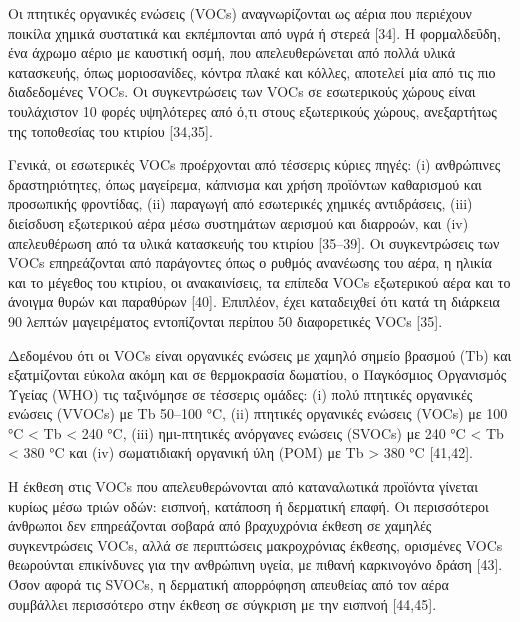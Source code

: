 Οι πτητικές οργανικές ενώσεις (VOCs) αναγνωρίζονται ως αέρια που περιέχουν ποικίλα χημικά συστατικά και εκπέμπονται από υγρά ή στερεά [34]. Η φορμαλδεΰδη, ένα άχρωμο αέριο με καυστική οσμή, που απελευθερώνεται από πολλά υλικά κατασκευής, όπως μοριοσανίδες, κόντρα πλακέ και κόλλες, αποτελεί μία από τις πιο διαδεδομένες VOCs. Οι συγκεντρώσεις των VOCs σε εσωτερικούς χώρους είναι τουλάχιστον 10 φορές υψηλότερες από ό,τι στους εξωτερικούς χώρους, ανεξαρτήτως της τοποθεσίας του κτιρίου [34,35].

Γενικά, οι εσωτερικές VOCs προέρχονται από τέσσερις κύριες πηγές: (i) ανθρώπινες δραστηριότητες, όπως μαγείρεμα, κάπνισμα και χρήση προϊόντων καθαρισμού και προσωπικής φροντίδας, (ii) παραγωγή από εσωτερικές χημικές αντιδράσεις, (iii) διείσδυση εξωτερικού αέρα μέσω συστημάτων αερισμού και διαρροών, και (iv) απελευθέρωση από τα υλικά κατασκευής του κτιρίου [35–39]. Οι συγκεντρώσεις των VOCs επηρεάζονται από παράγοντες όπως ο ρυθμός ανανέωσης του αέρα, η ηλικία και το μέγεθος του κτιρίου, οι ανακαινίσεις, τα επίπεδα VOCs εξωτερικού αέρα και το άνοιγμα θυρών και παραθύρων [40]. Επιπλέον, έχει καταδειχθεί ότι κατά τη διάρκεια 90 λεπτών μαγειρέματος εντοπίζονται περίπου 50 διαφορετικές VOCs [35].

Δεδομένου ότι οι VOCs είναι οργανικές ενώσεις με χαμηλό σημείο βρασμού (Tb) και εξατμίζονται εύκολα ακόμη και σε θερμοκρασία δωματίου, ο Παγκόσμιος Οργανισμός Υγείας (WHO) τις ταξινόμησε σε τέσσερις ομάδες: (i) πολύ πτητικές οργανικές ενώσεις (VVOCs) με Tb 50–100 °C, (ii) πτητικές οργανικές ενώσεις (VOCs) με 100 °C < Tb < 240 °C, (iii) ημι-πτητικές ανόργανες ενώσεις (SVOCs) με 240 °C < Tb < 380 °C και (iv) σωματιδιακή οργανική ύλη (POM) με Tb > 380 °C [41,42].

Η έκθεση στις VOCs που απελευθερώνονται από καταναλωτικά προϊόντα γίνεται κυρίως μέσω τριών οδών: εισπνοή, κατάποση ή δερματική επαφή. Οι περισσότεροι άνθρωποι δεν επηρεάζονται σοβαρά από βραχυχρόνια έκθεση σε χαμηλές συγκεντρώσεις VOCs, αλλά σε περιπτώσεις μακροχρόνιας έκθεσης, ορισμένες VOCs θεωρούνται επικίνδυνες για την ανθρώπινη υγεία, με πιθανή καρκινογόνο δράση [43]. Όσον αφορά τις SVOCs, η δερματική απορρόφηση απευθείας από τον αέρα συμβάλλει περισσότερο στην έκθεση σε σύγκριση με την εισπνοή [44,45].

